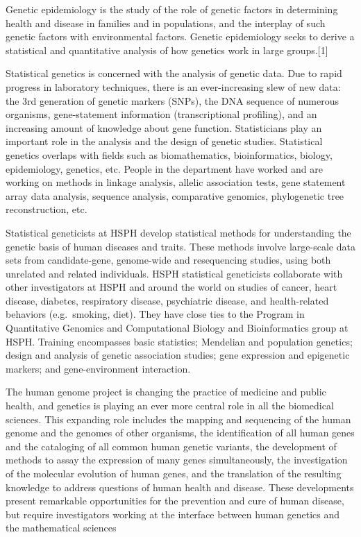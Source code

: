 \documentclass[12pt,]{krantz}
\renewenvironment{quote}{\begin{VF}}{\end{VF}}
\theoremstyle{definition}
\theoremstyle{definition}
\theoremstyle{definition}
\theoremstyle{remark}
\begin{document}
\begin{quote}
Genetic epidemiology is the study of the role of genetic factors in
determining health and disease in families and in populations, and the
interplay of such genetic factors with environmental factors. Genetic
epidemiology seeks to derive a statistical and quantitative analysis of
how genetics work in large groups.{[}1{]}
\end{quote}

\begin{quote}
Statistical genetics is concerned with the analysis of genetic data. Due
to rapid progress in laboratory techniques, there is an ever-increasing
slew of new data: the 3rd generation of genetic markers (SNPs), the DNA
sequence of numerous organisms, gene-statement information
(transcriptional profiling), and an increasing amount of knowledge about
gene function. Statisticians play an important role in the analysis and
the design of genetic studies. Statistical genetics overlaps with fields
such as biomathematics, bioinformatics, biology, epidemiology, genetics,
etc. People in the department have worked and are working on methods in
linkage analysis, allelic association tests, gene statement array data
analysis, sequence analysis, comparative genomics, phylogenetic tree
reconstruction, etc.
\end{quote}

\begin{quote}
Statistical geneticists at HSPH develop statistical methods for
understanding the genetic basis of human diseases and traits. These
methods involve large-scale data sets from candidate-gene, genome-wide
and resequencing studies, using both unrelated and related individuals.
HSPH statistical geneticists collaborate with other investigators at
HSPH and around the world on studies of cancer, heart disease, diabetes,
respiratory disease, psychiatric disease, and health-related behaviors
(e.g.~smoking, diet). They have close ties to the Program in
Quantitative Genomics and Computational Biology and Bioinformatics group
at HSPH. Training encompasses basic statistics; Mendelian and population
genetics; design and analysis of genetic association studies; gene
expression and epigenetic markers; and gene-environment interaction.
\end{quote}

\begin{quote}
The human genome project is changing the practice of medicine and public
health, and genetics is playing an ever more central role in all the
biomedical sciences. This expanding role includes the mapping and
sequencing of the human genome and the genomes of other organisms, the
identification of all human genes and the cataloging of all common human
genetic variants, the development of methods to assay the expression of
many genes simultaneously, the investigation of the molecular evolution
of human genes, and the translation of the resulting knowledge to
address questions of human health and disease. These developments
present remarkable opportunities for the prevention and cure of human
disease, but require investigators working at the interface between
human genetics and the mathematical sciences
\end{quote}
\end{document}
